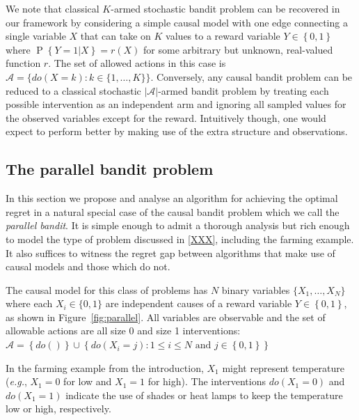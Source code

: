 \documentclass[11pt,a4paper,oneside]{book}
\newcommand{\eg}{\textit{e.g.}}
\newcommand{\set}[1]{\left\{#1\right\}}
\renewcommand{\P}[1]{\operatorname{P}\left\{#1\right\}}
\theoremstyle{plain}
\theoremstyle{definition}
\begin{document}
We note that classical $K$-armed stochastic bandit problem can be recovered in our framework by considering a simple causal model with one edge connecting a single variable $X$ that can take on $K$ values to a reward variable $Y \in \set{0,1}$ where $\P{Y = 1|X} = r(X)$ for some arbitrary but unknown, real-valued function $r$. The set of allowed actions in this case is $\mathcal{A} = \{ do(X = k) \colon k \in \{1, \ldots, K\}\}$. Conversely, any causal bandit problem can be reduced to a classical stochastic $|\mathcal{A}|$-armed bandit problem by treating each possible intervention as an independent arm and ignoring all sampled values for the observed variables except for the reward. Intuitively though, one would expect to perform better by making use of the extra structure and observations.


\subsection{The parallel bandit problem}

In this section we propose and analyse an algorithm for achieving the optimal regret in a natural special case of the causal bandit problem which we call the {\it parallel bandit}.
It is simple enough to admit a thorough analysis but rich enough to model the type of problem discussed in \ref{XXX}, including the farming example. It also suffices to witness the regret gap between algorithms that make use of causal models and those which do not.

The causal model for this class of problems has $N$ binary variables $\{ X_1, \ldots, X_N \}$ where each $X_i \in \{0,1\}$ are independent causes of a reward variable $Y \in \set{0,1}$, as shown in Figure~\ref{fig:parallel}. All variables are observable and the set of allowable actions are all size 0 and size 1 interventions: $\mathcal{A} = \set{do()} \cup \set{ do(X_i = j) \colon 1 \leq i \leq N \text{ and } j \in \set{0,1}}$

In the farming example from the introduction, $X_1$ might represent temperature (\eg, $X_1=0$ for low and $X_1=1$ for high). The interventions $do(X_1 = 0)$ and $do(X_1 = 1)$ indicate the use of shades or heat lamps to keep the temperature low or high, respectively.
\end{document}
